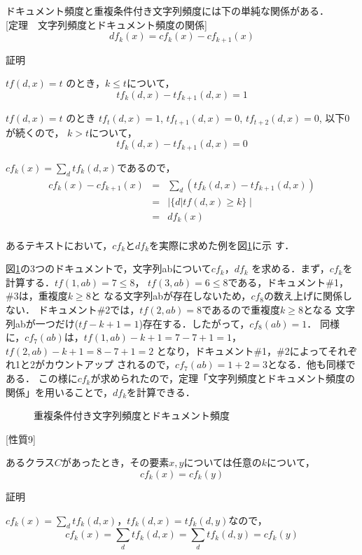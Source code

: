 ドキュメント頻度と重複条件付き文字列頻度には下の単純な関係がある．\\

[定理\ \ 文字列頻度とドキュメント頻度の関係]
$$  df_k(x) = cf_{k}(x) - cf_{k+1}(x)$$

証明\par

$tf(d,x) = t$ のとき，$k \leq t$について，
$$ tf_{k}(d,x) - tf_{k+1}(d,x) = 1$$

$tf(d,x) = t$ のとき
$tf_t(d,x) = 1$, $tf_{t+1}(d,x)=0$, $tf_{t+2}(d,x)=0$, 以下0が続くので，
$k>t$について，
   $$tf_{k}(d,x) - tf_{k+1}(d,x) = 0$$

$cf_k(x) = \sum_{d} tf_k(d,x)$であるので，
\begin{eqnarray*}
 cf_{k}(x) - cf_{k+1}(x)
     &=& \sum_{d}(tf_{k}(d,x) - tf_{k+1}(d,x))\\
     &=& \mid \{ d | tf(d,x) \geq k \} \mid\\
     &=& df_k(x)\\
\end{eqnarray*}

あるテキストにおいて，$cf_k$と$df_k$を実際に求めた例を図\ref{df_cf}に示
す．
\par
図\ref{df_cf}の3つのドキュメントで，文字列abについて$cf_k$，$df_k$
を求める．まず，$cf_k$を計算する．$tf(1,ab)=7 \leq 8$，
$tf(3,ab)=6 \leq 8$である，ドキュメント\#1，\#3は，重複度$k \geq 8$と
なる文字列abが存在しないため，$cf_8$の数え上げに関係しない．
ドキュメント\#2では，$tf(2,ab)=8$であるので重複度$k \geq 8$となる
文字列abが一つだけ($tf-k+1=1$)存在する．したがって，$cf_8(ab)=1$．
同様に，$cf_7(ab)$は，$tf(1,ab)-k+1=7-7+1=1$，$tf(2,ab)-k+1=8-7+1=2$
となり，ドキュメント\#1，\#2によってそれぞれ1と2がカウントアップ
されるので，$cf_7(ab)=1+2=3$となる．他も同様である．
この様に$cf_k$が求められたので，定理「文字列頻度とドキュメント頻度の
関係」を用いることで，$df_k$を計算できる．

 \begin{figure}[htbp]
  \begin{center}
   \epsfxsize=10cm
   
   \caption{重複条件付き文字列頻度とドキュメント頻度}
   \label{df_cf}
  \end{center}
 \end{figure}

[性質9]\par
あるクラス$C$があったとき，その要素$x,y$については任意の$k$について，
$$cf_k(x) = cf_k(y)$$


証明\par
$cf_k(x) = \sum_{d}tf_k(d,x)$，$tf_k(d,x)=tf_k(d,y)$なので，
$$cf_k(x) = \sum_{d}tf_k(d,x) = \sum_{d}tf_k(d,y) = cf_k(y)$$


